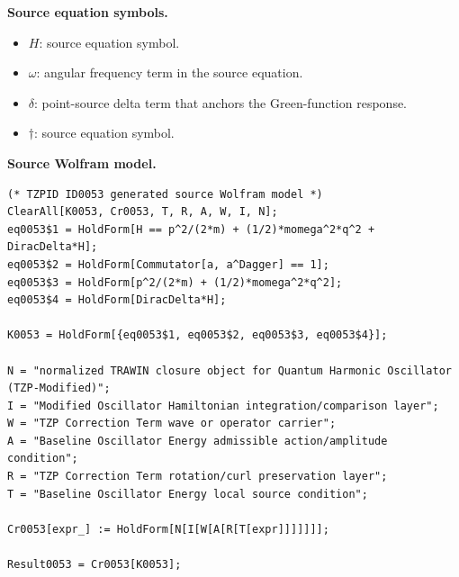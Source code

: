 \begin{minipage}[t]{0.49\linewidth}
\begingroup
\small
\raggedright
\textbf{Source equation symbols.}\par
\begin{itemize}[leftmargin=1.35em,itemsep=1pt,topsep=1pt,parsep=0pt]
    \item $H$: source equation symbol.
    \item $\omega$: angular frequency term in the source equation.
    \item $\delta$: point-source delta term that anchors the Green-function response.
    \item $\dagger$: source equation symbol.
\end{itemize}
\endgroup
\end{minipage}\hfill
\begin{minipage}[t]{0.47\linewidth}
\begingroup
\scriptsize
\raggedright
\textbf{Source Wolfram model.}\par
\begin{Verbatim}[fontsize=\tiny,breaklines=true,breakanywhere=true]
(* TZPID ID0053 generated source Wolfram model *)
ClearAll[K0053, Cr0053, T, R, A, W, I, N];
eq0053$1 = HoldForm[H == p^2/(2*m) + (1/2)*momega^2*q^2 + DiracDelta*H];
eq0053$2 = HoldForm[Commutator[a, a^Dagger] == 1];
eq0053$3 = HoldForm[p^2/(2*m) + (1/2)*momega^2*q^2];
eq0053$4 = HoldForm[DiracDelta*H];

K0053 = HoldForm[{eq0053$1, eq0053$2, eq0053$3, eq0053$4}];

N = "normalized TRAWIN closure object for Quantum Harmonic Oscillator (TZP-Modified)";
I = "Modified Oscillator Hamiltonian integration/comparison layer";
W = "TZP Correction Term wave or operator carrier";
A = "Baseline Oscillator Energy admissible action/amplitude condition";
R = "TZP Correction Term rotation/curl preservation layer";
T = "Baseline Oscillator Energy local source condition";

Cr0053[expr_] := HoldForm[N[I[W[A[R[T[expr]]]]]]];

Result0053 = Cr0053[K0053];
\end{Verbatim}
\endgroup
\end{minipage}

